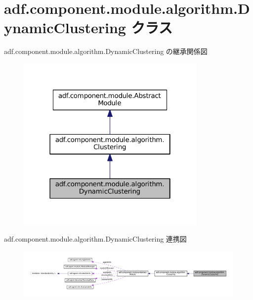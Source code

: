 \hypertarget{classadf_1_1component_1_1module_1_1algorithm_1_1DynamicClustering}{}\section{adf.\+component.\+module.\+algorithm.\+Dynamic\+Clustering クラス}
\label{classadf_1_1component_1_1module_1_1algorithm_1_1DynamicClustering}


adf.\+component.\+module.\+algorithm.\+Dynamic\+Clustering の継承関係図
\nopagebreak
\begin{figure}[H]
\begin{center}
\leavevmode
\includegraphics[width=262pt]{classadf_1_1component_1_1module_1_1algorithm_1_1DynamicClustering__inherit__graph}
\end{center}
\end{figure}


adf.\+component.\+module.\+algorithm.\+Dynamic\+Clustering 連携図
\nopagebreak
\begin{figure}[H]
\begin{center}
\leavevmode
\includegraphics[width=350pt]{classadf_1_1component_1_1module_1_1algorithm_1_1DynamicClustering__coll__graph}
\end{center}
\end{figure}
